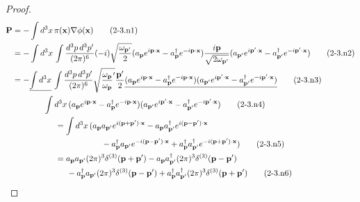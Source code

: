 \documentclass[a4paper,12pt]{article}
\begin{document}
\color{blue}
\begin{proof}
\begin{align*}
    \mathbf{P} &= -\int d^3x\, \pi(\mathbf{x}) \nabla \phi(\mathbf{x}) \tag{2-3.n1}\\
    &= -\int d^3 x\, \int \frac{d^3 p\, d^3 p'}{(2\pi)^6} (-i) \sqrt{\frac{\omega_{\mathbf{p}'}}{2}} (a_{\mathbf{p}} e^{i\mathbf{p} \cdot \mathbf{x}} - a_{\mathbf{p}}^{\dagger} e^{-i\mathbf{p} \cdot \mathbf{x}})\frac{i\mathbf{p}}{\sqrt{2\omega_{\mathbf{p}'}}} (a_{\mathbf{p}'} e^{i\mathbf{p}' \cdot \mathbf{x}} - a_{\mathbf{p}'}^{\dagger} e^{-i\mathbf{p}' \cdot \mathbf{x}}) \tag{2-3.n2}\\
    &= -\underline{\int d^3 x}\, \int \frac{d^3 p\, d^3 p'}{(2\pi)^6}\sqrt{\frac{\omega_{\mathbf{p}}}{\omega_{\mathbf{p}}}'}\frac{\mathbf{p}'}{2} \underline{(a_{\mathbf{p}} e^{i\mathbf{p} \cdot \mathbf{x}} - a_{\mathbf{p}}^{\dagger} e^{-i\mathbf{p} \cdot \mathbf{x}})(a_{\mathbf{p}'} e^{i\mathbf{p}' \cdot \mathbf{x}} - a_{\mathbf{p}'}^{\dagger} e^{-i\mathbf{p}' \cdot \mathbf{x}})} \tag{2-3.n3}\\
    &\quad \hspace{1cm} \int d^3 x\, (a_{\mathbf{p}} e^{i\mathbf{p} \cdot \mathbf{x}} - a_{\mathbf{p}}^{\dagger} e^{-i\mathbf{p} \cdot \mathbf{x}})(a_{\mathbf{p}'} e^{i\mathbf{p}' \cdot \mathbf{x}} - a_{\mathbf{p}'}^{\dagger} e^{-i\mathbf{p}' \cdot \mathbf{x}}) \tag{2-3.n4}\\
    &\quad \hspace{1.5cm} = \int d^3 x\, (a_{\mathbf{p}} a_{\mathbf{p}'} e^{i(\mathbf{p}+\mathbf{p}') \cdot \mathbf{x}} - a_{\mathbf{p}} a_{\mathbf{p}'}^{\dagger} e^{i(\mathbf{p}-\mathbf{p}') \cdot \mathbf{x}}\\
    &\quad \hspace{3.5cm} - a_{\mathbf{p}}^{\dagger} a_{\mathbf{p}'} e^{-i(\mathbf{p}-\mathbf{p}') \cdot \mathbf{x}} + a_{\mathbf{p}}^{\dagger} a_{\mathbf{p}'}^{\dagger} e^{-i(\mathbf{p}+\mathbf{p}') \cdot \mathbf{x}}) \tag{2-3.n5}\\
    &\quad \hspace{1.5cm} =  a_{\mathbf{p}} a_{\mathbf{p}'} (2\pi)^3 \delta^{(3)}(\mathbf{p}+\mathbf{p}') - a_{\mathbf{p}} a_{\mathbf{p}'}^{\dagger} (2\pi)^3 \delta^{(3)}(\mathbf{p}-\mathbf{p}') \\
    &\quad \hspace{2cm} - a_{\mathbf{p}}^{\dagger} a_{\mathbf{p}'} (2\pi)^3 \delta^{(3)}(\mathbf{p}-\mathbf{p}') + a_{\mathbf{p}}^{\dagger} a_{\mathbf{p}'}^{\dagger} (2\pi)^3 \delta^{(3)}(\mathbf{p}+\mathbf{p}') \tag{2-3.n6}\\

\end{align*}
\end{proof}
\end{document}
